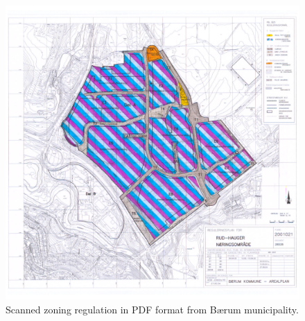 \begin{figure}[H]
	\centering
	\includegraphics[width=0.8\linewidth]{fig/eksempel_plan.pdf}
	\caption{Scanned zoning regulation in PDF format from Bærum municipality. }
	\label{fig:examplezoning}
\end{figure}
